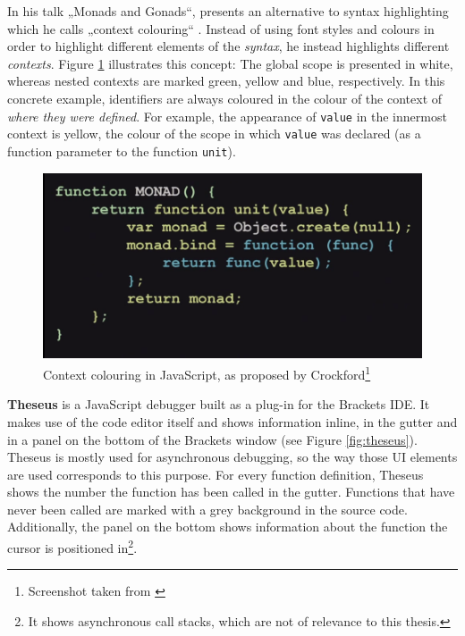 In his talk „Monads and Gonads“,  presents an
alternative to syntax highlighting which he calls „context colouring“
\citeyear{crockford}. Instead of using font styles and colours in order
to highlight different elements of the \emph{syntax}, he instead
highlights different \emph{contexts}. Figure
\ref{fig:contexthighlighting} illustrates this concept: The global scope
is presented in white, whereas nested contexts are marked green, yellow
and blue, respectively. In this concrete example, identifiers are always
coloured in the colour of the context of \emph{where they were defined}.
For example, the appearance of \texttt{value} in the innermost context
is yellow, the colour of the scope in which \texttt{value} was declared
(as a function parameter to the function \texttt{unit}).

\begin{figure}[htbp]
\centering
\includegraphics[keepaspectratio,width=\textwidth,height=0.75\textheight]{img/context.png}
\caption{Context colouring in JavaScript, as proposed by Crockford\footnote{Screenshot taken from \cite{crockford}}}
\label{fig:contexthighlighting}
\end{figure}

\textbf{Theseus} is a JavaScript debugger built as a plug-in for the
Brackets IDE. It makes use of the code editor itself and shows
information inline, in the gutter and in a panel on the bottom of the
Brackets window (see Figure \ref{fig:theseus}). Theseus is mostly used
for asynchronous debugging, so the way those UI elements are used
corresponds to this purpose. For every function definition, Theseus
shows the number the function has been called in the gutter. Functions
that have never been called are marked with a grey background in the
source code. Additionally, the panel on the bottom shows information
about the function the cursor is positioned
in\footnote{It shows asynchronous call stacks, which are not of relevance to this thesis.}.

